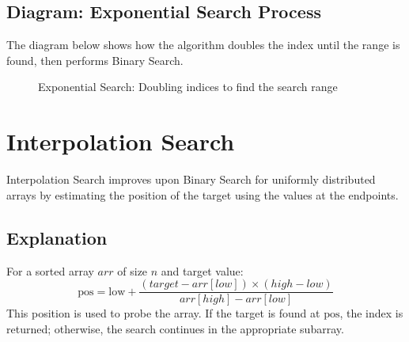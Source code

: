 \subsection{Diagram: Exponential Search Process}
The diagram below shows how the algorithm doubles the index until the range is found, then performs Binary Search.

\begin{figure}[H]
\centering
{}
\caption{Exponential Search: Doubling indices to find the search range}
\end{figure}

\section{Interpolation Search}
Interpolation Search improves upon Binary Search for uniformly distributed arrays by estimating the position of the target using the values at the endpoints.

\subsection{Explanation}
For a sorted array \( arr \) of size \( n \) and target value:
\[
\text{pos} = \text{low} + \frac{(target - arr[low]) \times (high - low)}{arr[high] - arr[low]}
\]
This position is used to probe the array. If the target is found at \(\text{pos}\), the index is returned; otherwise, the search continues in the appropriate subarray.

